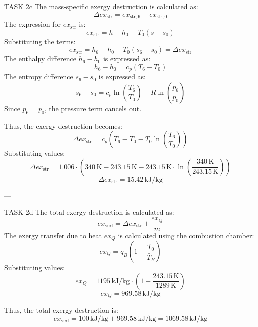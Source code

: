 TASK 2c  
The mass-specific exergy destruction is calculated as:  
\[
\Delta ex_{\text{str}} = ex_{\text{str},6} - ex_{\text{str},0}
\]  
The expression for \( ex_{\text{str}} \) is:  
\[
ex_{\text{str}} = h - h_0 - T_0 (s - s_0)
\]  
Substituting the terms:  
\[
ex_{\text{str}} = h_6 - h_0 - T_0 (s_6 - s_0) = \Delta ex_{\text{str}}
\]  
The enthalpy difference \( h_6 - h_0 \) is expressed as:  
\[
h_6 - h_0 = c_p (T_6 - T_0)
\]  
The entropy difference \( s_6 - s_0 \) is expressed as:  
\[
s_6 - s_0 = c_p \ln \left( \frac{T_6}{T_0} \right) - R \ln \left( \frac{p_6}{p_0} \right)
\]  
Since \( p_6 = p_0 \), the pressure term cancels out.  

Thus, the exergy destruction becomes:  
\[
\Delta ex_{\text{str}} = c_p (T_6 - T_0 - T_0 \ln \left( \frac{T_6}{T_0} \right))
\]  
Substituting values:  
\[
\Delta ex_{\text{str}} = 1.006 \cdot (340 \, \text{K} - 243.15 \, \text{K} - 243.15 \, \text{K} \cdot \ln \left( \frac{340 \, \text{K}}{243.15 \, \text{K}} \right))
\]  
\[
\Delta ex_{\text{str}} = 15.42 \, \text{kJ/kg}
\]  

---

TASK 2d  
The total exergy destruction is calculated as:  
\[
ex_{\text{verl}} = \Delta ex_{\text{str}} + \frac{ex_Q}{\dot{m}}
\]  
The exergy transfer due to heat \( ex_Q \) is calculated using the combustion chamber:  
\[
ex_Q = q_B \left( 1 - \frac{T_0}{\bar{T}_B} \right)
\]  
Substituting values:  
\[
ex_Q = 1195 \, \text{kJ/kg} \cdot \left( 1 - \frac{243.15 \, \text{K}}{1289 \, \text{K}} \right)
\]  
\[
ex_Q = 969.58 \, \text{kJ/kg}
\]  

Thus, the total exergy destruction is:  
\[
ex_{\text{verl}} = 100 \, \text{kJ/kg} + 969.58 \, \text{kJ/kg} = 1069.58 \, \text{kJ/kg}
\]  
